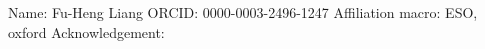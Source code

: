 %
%
%

Name: Fu-Heng Liang
ORCID: 0000-0003-2496-1247
Affiliation macro: ESO, oxford
Acknowledgement:  
